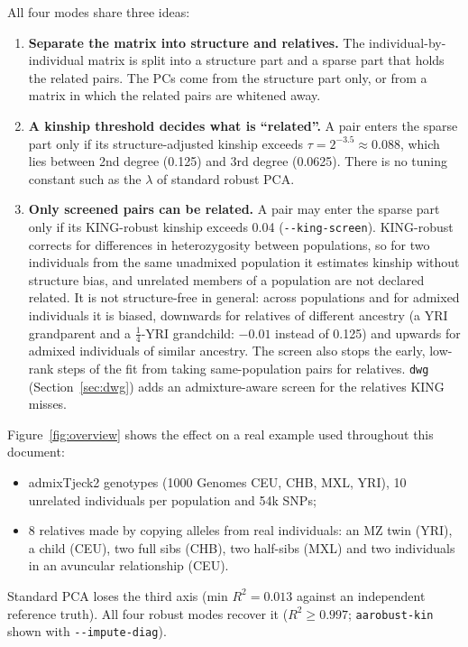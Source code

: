 \documentclass[11pt,a4paper]{article}
\newcommand{\opt}[1]{\texttt{-{}-#1}}
\begin{document}
All four modes share three ideas:
\begin{enumerate}
  \item \textbf{Separate the matrix into structure and relatives.} The
    individual-by-individual matrix is split into a structure part and a
    sparse part that holds the related pairs. The PCs come from the structure
    part only, or from a matrix in which the related pairs are whitened away.
  \item \textbf{A kinship threshold decides what is ``related''.} A pair enters
    the sparse part only if its structure-adjusted kinship exceeds
    $\tau=2^{-3.5}\approx0.088$, which lies between 2nd degree (0.125) and 3rd
    degree (0.0625). There is no tuning constant such as the $\lambda$ of
    standard robust PCA.
  \item \textbf{Only screened pairs can be related.} A pair may enter the sparse
    part only if its KING-robust kinship exceeds 0.04
    (\opt{king-screen}). KING-robust corrects for differences in
    heterozygosity between populations, so for two individuals from the same
    unadmixed population it estimates kinship without structure bias, and
    unrelated members of a population are not declared related. It is not
    structure-free in general: across populations and for admixed individuals
    it is biased, downwards for relatives of different ancestry (a YRI
    grandparent and a $\tfrac14$-YRI grandchild: $-0.01$ instead of 0.125) and
    upwards for admixed individuals of similar ancestry. The screen also stops
    the early, low-rank steps of the fit from taking same-population pairs for
    relatives. \texttt{dwg} (Section~\ref{sec:dwg}) adds an admixture-aware
    screen for the relatives KING misses.
\end{enumerate}

Figure~\ref{fig:overview} shows the effect on a real example used throughout
this document:
\begin{itemize}
  \item admixTjeck2 genotypes (1000 Genomes CEU, CHB, MXL, YRI), 10 unrelated
    individuals per population and 54k SNPs;
  \item 8 relatives made by copying alleles from real individuals: an MZ twin
    (YRI), a child (CEU), two full sibs (CHB), two half-sibs (MXL) and two
    individuals in an avuncular relationship (CEU).
\end{itemize}
Standard PCA loses the third axis (min $R^2=0.013$ against an independent
reference truth). All four robust modes recover it ($R^2\ge0.997$; \texttt{aarobust-kin} shown with \opt{impute-diag}).
\end{document}
